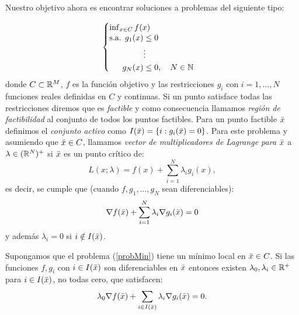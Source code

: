 	Nuestro objetivo ahora es encontrar soluciones a problemas del siguiente tipo:
	
		\begin{equation}\label{probMin}
		\begin{cases}
		\inf_{x\in C} f(x)\\
		\begin{split}
		\text{s.a. } g_1(x) &\leq 0 \\
		&\vdots \\
		g_N(x) &\leq 0, \quad N \in \mathbb{N}
		\end{split}
		
		\end{cases} 
		\end{equation}
		donde $ C \subset \mathbb{R}^M$, $ f  $ es la función objetivo y las restricciones $ g_i $ con $ i =1,\dots, N $ funciones reales definidas en $ C $ y continuas. Si un punto satisface todas las restricciones diremos que es \textit{factible}  y como consecuencia llamamos \textit{región de factibilidad} al conjunto de todos los puntos factibles. Para un punto factible $ \bar{x} $ definimos el \textit{conjunto activo} como $ I(\bar{x}) = \{i: g_i(\bar{x}) = 0\}$. Para este problema y asumiendo que $ \bar{x} \in C $, llamamos \textit{vector de multiplicadores de Lagrange para $ \bar{x} $} a $ \lambda \in (\mathbb{R}^N)^+ $ si $ \bar{x} $ es un punto crítico de:
		\[
		L(x;\lambda) = f(x) + \sum_{i=1}^{N} \lambda_i g_i(x),
		\]
		es decir, se cumple que (cuando $ f,g_1,\dots,g_N $ sean diferenciables):
		\[
		\nabla f(\bar{x}) + \sum_{i=1}^{N} \lambda_i \nabla g_i(\bar{x}) = 0
		\]
		y además $ \lambda_i = 0 $ si $ i \notin I(\bar{x}) $.
		\begin{teoremaBox}\label{FritzJohn}
			Supongamos que el problema (\ref{probMin}) tiene un mínimo local en $ \bar{x} \in C $. Si las funciones $ f, g_i $ con $ i \in I(\bar{x}) $ son diferenciables en $ \bar{x} $ entonces existen $ \lambda_0, \lambda_i \in \mathbb{R}^+ $ para $ i \in I(\bar{x}) $, no todas cero, que satisfacen:
			\[
			\lambda_0 \nabla f(\bar{x}) + \sum_{i \in I(\bar{x})} \lambda_i \nabla g_i(\bar{x}) = 0.
			\]
		\end{teoremaBox}
